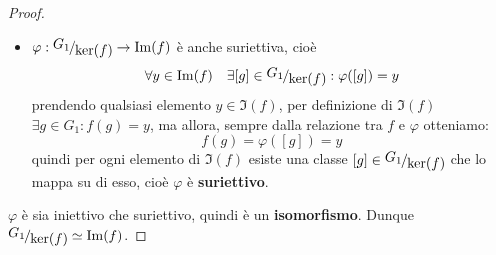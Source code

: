 \documentclass[../main.tex]{subfiles}
\begin{document}
\begin{proof}
\begin{itemize}
        \item $\varphi : \nicefrac{G_1}{\ker (f)} \to \Im (f)$ è anche suriettiva,
              cioè
              \[
                  \forall y \in \Im(f) \quad \exists [g] \in \nicefrac{G_1}{\ker(f)} : \varphi([g]) = y
              \]
              prendendo qualsiasi elemento $y \in \Im(f)$, per definizione di $\Im (f)$ $\exists g \in G_1 : f(g) = y$, ma allora, sempre dalla relazione tra $f$ e $\varphi$ otteniamo:
              \[
                  f(g) = \varphi([g]) = y
              \]
              quindi per ogni elemento di $\Im(f)$ esiste una classe $[g] \in \nicefrac{G_1}{\ker(f)}$ che lo mappa su di esso, cioè $\varphi$ è    \textbf{suriettivo}.
    \end{itemize}
    $\varphi$ è sia iniettivo che suriettivo, quindi è un \textbf{isomorfismo}.
    Dunque $\nicefrac{G_1}{\ker(f)} \simeq \Im(f)$.
\end{proof}
\end{document}
